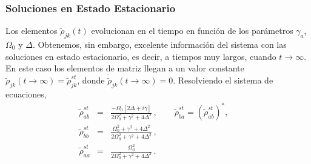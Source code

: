 \documentclass[12pt]{report}
\begin{document}
\subsubsection{Soluciones en Estado Estacionario} 
Los elementos $\tilde{\rho}_{jk}(t)$ evolucionan en el tiempo en funci\'on de los 
par\'ametros $\gamma_a$, $\Omega_0$ y $\Delta$. Obtenemos, sin embargo, excelente informaci\'on del sistema con las soluciones en estado estacionario, 
es decir, a tiempos muy largos, cuando $t \to \infty$. En este caso los 
elementos de matriz llegan a un valor constante 
$\tilde{\rho}_{jk}(t \to \infty) = \tilde{\rho}_{jk}^{st}$, donde 
$\dot{\tilde{\rho}}_{jk} (t \to \infty) =0$. Resolviendo el sistema de ecuaciones, 
%
\begin{subequations}
\begin{eqnarray}
\tilde{\rho}_{ab}^{st} &=& \frac{-\Omega_0 [2\Delta + i \gamma]}
	{2\Omega_0^2 +\gamma^2 +4\Delta^2} \,, 
	\qquad \tilde{\rho}_{ba}^{st} = \left( \tilde{\rho}_{ab}^{st} \right)^\ast , 
	\quad \\ 
\tilde{\rho}_{bb}^{st} &=& \frac{\Omega_0^2 +\gamma^2 +4\Delta^2}
	{2\Omega_0^2 +\gamma^2 +4\Delta^2}  \,, \\ 
\tilde{\rho}_{aa}^{st} &=& \frac{\Omega_0^2}{2\Omega_0^2 
	+\gamma^2 +4\Delta^2}	\,.
\end{eqnarray}
\end{subequations}
\end{document}
